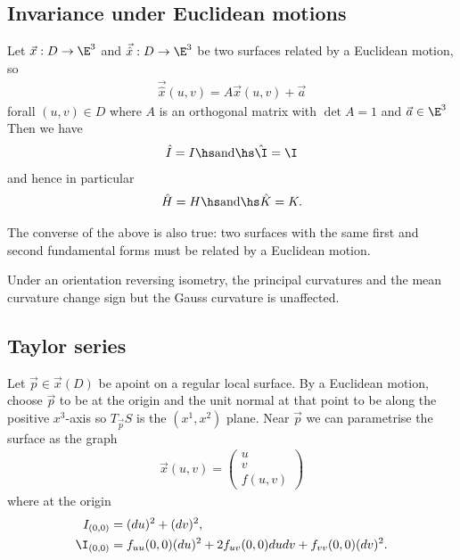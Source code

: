 \documentclass{article}
\begin{document}
\subsection{Invariance under Euclidean motions}

\begin{theorem}[Notes 9.7]
    Let $\vec x: D\to\E^3$ and $\vec{\hat x}:D\to\E^3$ be two surfaces related by a 
    Euclidean motion, so 
    \begin{align*}
        \vec{\hat x} (u,v) = A\vec x(u,v)+\vec a
    \end{align*}
    forall $(u,v)\in D$ where $A$ is an orthogonal matrix with $\det A=1$ and $\vec a\in\E^3$
    Then we have 
    \begin{align*}
        \hat I = I \hs \text{and} \hs \hat\I = \I
    \end{align*}
    and hence in particular
    \begin{align*}
        \hat H = H \hs \text{and} \hs \hat K = K.
    \end{align*}
\end{theorem}

\begin{theorem}
    The converse of the above is also true: two surfaces with the same first and second 
    fundamental forms must be related by a Euclidean motion.
\end{theorem}

\begin{proposition}[Notes 9.9]
    Under an orientation reversing isometry, the principal curvatures and the mean curvature 
    change sign but the Gauss curvature is unaffected. 
\end{proposition}

\subsection{Taylor series}

\begin{proposition}[Notes 9.10]
    Let $\vec p \in \vec x(D)$ be apoint on a regular local surface. By a Euclidean motion,
    choose $\vec p$ to be at the origin and the unit normal at that point to be along the positive
    $x^3$-axis so $T_{\vec p}S$ is the $(x^1,x^2)$ plane. Near $\vec p$ we can parametrise 
    the surface as the graph 
    \begin{align*}
        \vec x(u,v)=\begin{pmatrix}
            u \\ v \\ f(u,v)
        \end{pmatrix}
    \end{align*}
    where at the origin
    \begin{align*}
        I_{(0,0)}&=(du)^2+(dv)^2,\\
        \I_{(0,0)}&=f_{uu}(0,0)(du)^2+2f_{uv}(0,0)dudv+f_{vv}(0,0)(dv)^2.
    \end{align*}
\end{proposition}
\end{document}
